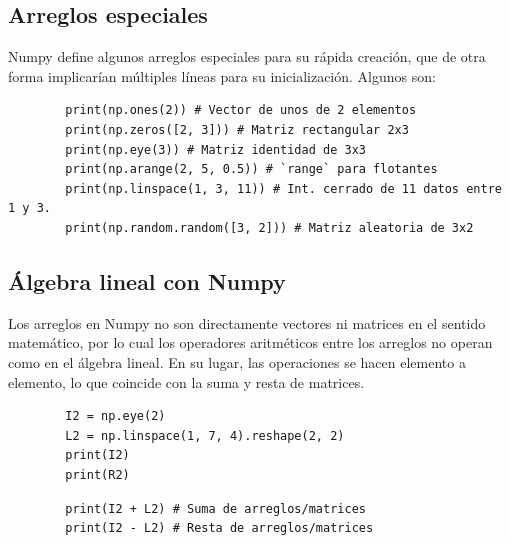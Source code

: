 \subsection{Arreglos especiales}

Numpy define algunos arreglos especiales para su rápida creación, que de
otra forma implicarían múltiples líneas para su inicialización. Algunos
son:

\begin{listing}[H]
    \begin{verbatim}
        print(np.ones(2)) # Vector de unos de 2 elementos
        print(np.zeros([2, 3])) # Matriz rectangular 2x3
        print(np.eye(3)) # Matriz identidad de 3x3
        print(np.arange(2, 5, 0.5)) # `range` para flotantes
        print(np.linspace(1, 3, 11)) # Int. cerrado de 11 datos entre 1 y 3.
        print(np.random.random([3, 2])) # Matriz aleatoria de 3x2
    \end{verbatim}
\end{listing}



\subsection{Álgebra lineal con Numpy}

Los arreglos en Numpy no son directamente vectores ni matrices en el
sentido matemático, por lo cual los operadores aritméticos entre los
arreglos no operan como en el álgebra lineal. En su lugar, las
operaciones se hacen elemento a elemento, lo que coincide con la suma y
resta de matrices.

\begin{listing}[H]
    \begin{verbatim}
        I2 = np.eye(2)
        L2 = np.linspace(1, 7, 4).reshape(2, 2)
        print(I2)
        print(R2) 
    \end{verbatim}
\end{listing}

\begin{listing}[H]
    \begin{verbatim}
        print(I2 + L2) # Suma de arreglos/matrices
        print(I2 - L2) # Resta de arreglos/matrices
    \end{verbatim}
\end{listing}

